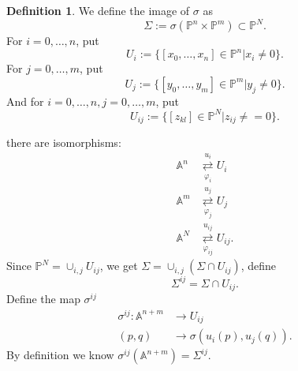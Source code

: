 \documentclass{amsart}
\theoremstyle{plain}
\theoremstyle{definition}
\newtheorem{definition}{Definition}
\theoremstyle{remark}
\numberwithin{equation}{section}
\begin{document}
\begin{definition}
	We define the image of $ \sigma $ as
	\begin{equation*}
	\Sigma := \sigma(\mathbb{P}^n\times \mathbb{P}^m)\subset \mathbb{P}^N.
	\end{equation*}
	For $ i=0,\dots,n $, put
	\begin{equation*}
	 U_i:=\{ [x_0,\dots,x_n]\in \mathbb{P}^n|x_i\neq 0 \}.
	\end{equation*}
	 For $ j=0,\dots,m $, put 
	 \begin{equation*}
	 U_j:=\{ [y_0,\dots,y_m]\in\mathbb{P}^m|y_j\neq 0 \}.
	 \end{equation*}
	 And for $ i=0,\dots,n,j=0,\dots,m $, put 
	 \begin{equation*}
	 U_{ij}:=\{ [z_{kl}]\in \mathbb{P}^{N}|z_{ij}\neq =0 \}.
	 \end{equation*}
\end{definition}
there are isomorphisms:
	 \begin{align*}
	 \mathbb{A}^n & \mathop{\rightleftarrows}\limits_{\varphi_i}^{u_i}  U_i\\
	 \mathbb{A}^m & \mathop{\rightleftarrows}\limits_{\varphi_j}^{u_j} U_j\\
	 \mathbb{A}^N & \mathop{\rightleftarrows}\limits_{\varphi_{ij}}^{u_{ij}} U_{ij}.
	 \end{align*}
Since $ \mathbb{P}^N=\mathop{\cup}_{i,j}U_{ij} $, we get $ \Sigma = \mathop{\cup}_{i,j}(\Sigma \cap U_{ij}) $, define 
\begin{equation*}
\Sigma^{ij}=\Sigma \cap U_{ij}.
\end{equation*}
Define the map $ \sigma^{ij} $
\begin{align*}
	\sigma^{ij}:\mathbb{A}^{n+m} & \to U_{ij}\\
	(p,q) & \to \sigma (u_i(p),u_j(q)). 
\end{align*}
By definition we know $ \sigma^{ij}(\mathbb{A}^{n+m})=\Sigma^{ij} $.
\end{document}
